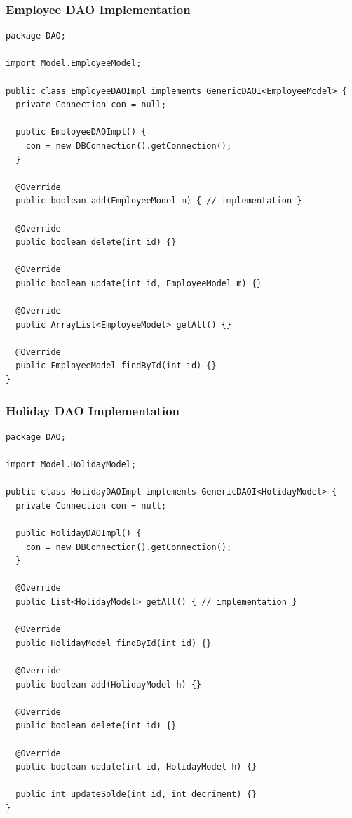 \documentclass[12pt]{article}
\begin{document}
\subsubsection{Employee DAO Implementation}
\begin{lstlisting}
package DAO;

import Model.EmployeeModel;

public class EmployeeDAOImpl implements GenericDAOI<EmployeeModel> {
  private Connection con = null;

  public EmployeeDAOImpl() {
    con = new DBConnection().getConnection();
  }

  @Override
  public boolean add(EmployeeModel m) { // implementation }

  @Override
  public boolean delete(int id) {}

  @Override
  public boolean update(int id, EmployeeModel m) {}

  @Override
  public ArrayList<EmployeeModel> getAll() {}

  @Override
  public EmployeeModel findById(int id) {}
}
\end{lstlisting}

\pagebreak

\subsubsection{Holiday DAO Implementation}
\begin{lstlisting}
package DAO;

import Model.HolidayModel;

public class HolidayDAOImpl implements GenericDAOI<HolidayModel> {
  private Connection con = null;

  public HolidayDAOImpl() {
    con = new DBConnection().getConnection();
  }

  @Override
  public List<HolidayModel> getAll() { // implementation }

  @Override
  public HolidayModel findById(int id) {}

  @Override
  public boolean add(HolidayModel h) {}

  @Override
  public boolean delete(int id) {}

  @Override
  public boolean update(int id, HolidayModel h) {}

  public int updateSolde(int id, int decriment) {}
}

\end{lstlisting}

\pagebreak
\end{document}
